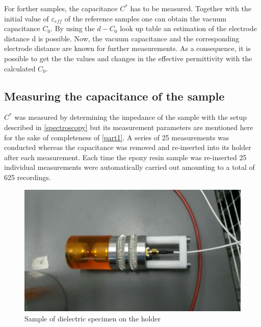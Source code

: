 For forther samples, the capacitance $C^*$ has to be measured. Together with the initial value of $\varepsilon_{eff}$ of the reference samples one can obtain the vacuum capacitance $C_0$. By using the $d-C_0$ look up table an estimation of the electrode distance d is possible. Now, the vacuum capacitance and the corresponding electrode distance are known for further measurements. As a consequence, it is possible to get the the values and changes in the effective permittivity with the calculated $C_0$.


\subsection{Measuring the capacitance of the sample}

$C^*$ was measured by determining the impedance of the sample with the setup described in \ref{spectroscopy} but its measurement
parameters are mentioned here for the sake of completeness of \ref{part1}.
A series of 25 measurements was conducted whereas the capacitance was removed
and re-inserted into its holder after each measurement. Each time the epoxy resin sample was
re-inserted 25 individual measurements were automatically carried out amounting to a total of 625 recordings.

\begin{figure}[h!tb]
	\centering
	\includegraphics[width=\textwidth]{figures/Method/Experimentaufbau/epoxy.jpg}		
	\caption[Kurze Abbildungsbeschreibung]{Sample of dielectric specimen on the holder} \label{fig.comsol_beispiel}

\end{figure}


